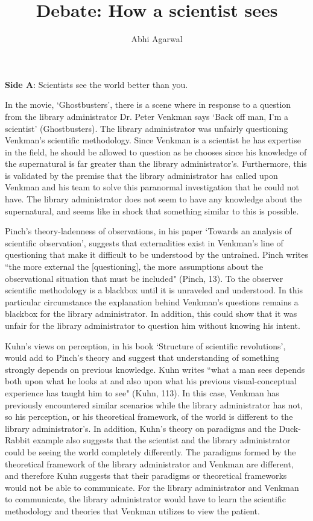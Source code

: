 \documentclass[11pt, oneside]{article}
\title{Debate: How a scientist sees\vspace{-0.4cm}}
\author{Abhi Agarwal\vspace{-1cm}}
\date{}
\begin{document}
\maketitle

\noindent \textbf{Side A}: Scientists see the world better than you.

\par In the movie, `Ghostbusters', there is a scene where in response to a question from the library administrator Dr. Peter Venkman says `Back off man, I'm a scientist' (Ghostbusters). The library administrator was unfairly questioning Venkman's scientific methodology. Since Venkman is a scientist he has expertise in the field, he should be allowed to question as he chooses since his knowledge of the supernatural is far greater than the library administrator's. Furthermore, this is validated by the premise that the library administrator has called upon Venkman and his team to solve this paranormal investigation that he could not have. The library administrator does not seem to have any knowledge about the supernatural, and seems like in shock that something similar to this is possible.

\par Pinch's theory-ladenness of observations, in his paper `Towards an analysis of scientific observation', suggests that externalities exist in Venkman's line of questioning that make it difficult to be understood by the untrained. Pinch writes ``the more external the [questioning], the more assumptions about the observational situation that must be included" (Pinch, 13). To the observer scientific methodology is a blackbox until it is unraveled and understood. In this particular circumstance the explanation behind Venkman's questions remains a blackbox for the library administrator. In addition, this could show that it was unfair for the library administrator to question him without knowing his intent.

\par Kuhn's views on perception, in his book `Structure of scientific revolutions', would add to Pinch's theory and suggest that understanding of something strongly depends on previous knowledge. Kuhn writes ``what a man sees depends both upon what he looks at and also upon what his previous visual-conceptual experience has taught him to see" (Kuhn, 113). In this case, Venkman has previously encountered similar scenarios while the library administrator has not, so his perception, or his theoretical framework, of the world is different to the library administrator's. In addition, Kuhn's theory on paradigms and the Duck-Rabbit example also suggests that the scientist and the library administrator could be seeing the world completely differently. The paradigms formed by the theoretical framework of the library administrator and Venkman are different, and therefore Kuhn suggests that their paradigms or theoretical frameworks would not be able to communicate. For the library administrator and Venkman to communicate, the library administrator would have to learn the scientific methodology and theories that Venkman utilizes to view the patient.
\end{document}
